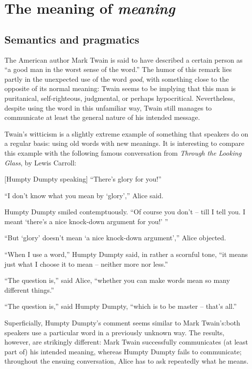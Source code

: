 \chapter{The meaning of \textit{meaning}}\label{sec:1}

\section{Semantics and pragmatics}\label{sec:1.1}

The American author Mark Twain is said to have described a certain person as “a good man in the worst sense of the word.” The humor of this remark lies partly in the unexpected use of the word \textit{good}, with something close to the opposite of its normal meaning: Twain seems to be implying that this man is puritanical, self-righteous, judgmental, or perhaps hypocritical. Nevertheless, despite using the word in this unfamiliar way, Twain still manages to communicate at least the general nature of his intended message.



Twain’s witticism is a slightly extreme example of something that speakers do on a regular basis: using old words with new meanings. It is interesting to compare this example with the following famous conversation from \textit{Through the Looking Glass}, by Lewis Carroll:


\ea
{}[Humpty Dumpty speaking] “There’s glory for you!”

“I don’t know what you mean by ‘glory’,” Alice said.

Humpty Dumpty smiled contemptuously. “Of course you don’t – till I tell you. I meant ‘there’s a nice knock-down argument for you!’ ”

“But ‘glory’ doesn’t mean ‘a nice knock-down argument’,” Alice objected. 

“When I use a word,” Humpty Dumpty said, in rather a scornful tone, “it means just what I choose it to mean – neither more nor less.”

“The question is,” said Alice, “whether you can make words mean so many different things.”

“The question is,” said Humpty Dumpty, “which is to be master – that’s all.”
\z

Superficially, Humpty Dumpty’s comment seems similar to Mark Twain's:\linebreak both speakers use a particular word in a previously unknown way. The results, however, are strikingly different: Mark Twain successfully communicates (at least part of) his intended meaning, whereas Humpty Dumpty fails to communicate; throughout the ensuing conversation, Alice has to ask repeatedly what he means.



